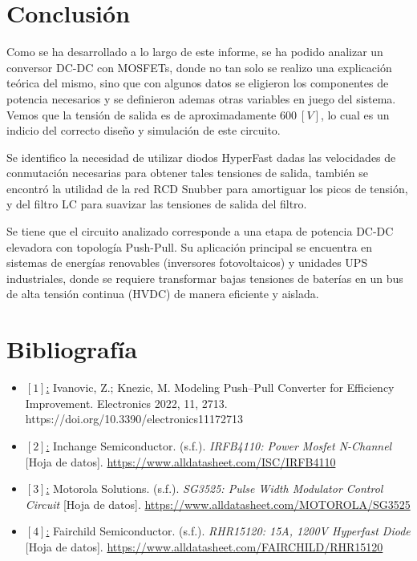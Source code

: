 \documentclass[12pt,a4paper]{article}
\begin{document}
\section{Conclusión}
Como se ha desarrollado a lo largo de este informe, se ha podido analizar un conversor DC-DC con MOSFETs, donde no tan solo se realizo una explicación teórica del mismo, sino que con algunos datos se eligieron los componentes de potencia necesarios y se definieron ademas otras variables en juego del sistema. Vemos que la tensión de salida es de aproximadamente $600 \ [V]$, lo cual es un indicio del correcto diseño y simulación de este circuito.

Se identifico la necesidad de utilizar diodos HyperFast dadas las velocidades de conmutación necesarias para obtener tales tensiones de salida, también se encontró la utilidad de la red RCD Snubber para amortiguar los picos de tensión, y del filtro LC para suavizar las tensiones de salida del filtro.

Se tiene que el circuito analizado corresponde a una etapa de potencia DC-DC elevadora con topología Push-Pull. Su aplicación principal se encuentra en sistemas de energías renovables (inversores fotovoltaicos) y unidades UPS industriales, donde se requiere transformar bajas tensiones de baterías en un bus de alta tensión continua (HVDC) de manera eficiente y aislada.


\section{Bibliografía}
\begin{itemize}
    \item \underline{$[1]$:} Ivanovic, Z.; Knezic, M. Modeling Push–Pull Converter for Efficiency Improvement. Electronics 2022, 11, 2713. https://doi.org/10.3390/electronics11172713
    \item \underline{$[2]$:} Inchange Semiconductor. (s.f.). \textit{IRFB4110: Power Mosfet N-Channel} [Hoja de datos]. \href{https://www.alldatasheet.com/datasheet-pdf/view/834151/ISC/IRFB4110.html}{https://www.alldatasheet.com/ISC/IRFB4110}
    \item \underline{$[3]$:} Motorola Solutions. (s.f.). \textit{SG3525: Pulse Width Modulator Control Circuit} [Hoja de datos]. \href{https://www.alldatasheet.com/datasheet-pdf/view/5632/MOTOROLA/SG3525.html}{https://www.alldatasheet.com/MOTOROLA/SG3525}
    \item \underline{$[4]$:} Fairchild Semiconductor. (s.f.). \textit{RHR15120: 15A, 1200V Hyperfast Diode} [Hoja de datos]. \href{https://www.alldatasheet.com/datasheet-pdf/view/54454/FAIRCHILD/RHR15120.html}{https://www.alldatasheet.com/FAIRCHILD/RHR15120}
\end{itemize}
\end{document}
